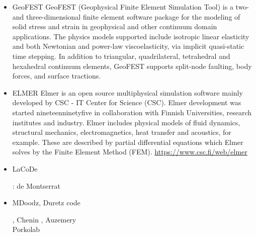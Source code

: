 \begin{itemize}
\item {\codefont GeoFEST} 
GeoFEST (Geophysical Finite Element Simulation Tool) is a two- and three-dimensional finite
element software package for the modeling of solid stress and strain in geophysical and 
other continuum domain applications.
The physics models supported include isotropic linear elasticity and both Newtonian and power-law
viscoelasticity, via implicit quasi-static time stepping. In addition to triangular, 
quadrilateral, tetrahedral and hexahedral continuum elements, GeoFEST supports split-node 
faulting, body forces, and surface tractions.


{\small
\noindent
\cite{paln08}
}

\item {\codefont ELMER} 
Elmer is an open source multiphysical simulation software mainly developed by 
CSC - IT Center for Science (CSC). Elmer development was started nineteenninetyfive in collaboration with 
Finnish Universities, research institutes and industry. Elmer includes physical models of 
fluid dynamics, structural mechanics, electromagnetics, heat transfer and acoustics, 
for example. These are described by partial differential equations which Elmer solves 
by the Finite Element Method (FEM). \url{https://www.csc.fi/web/elmer}

\cite{maierova}
\cite{mals14}

\item {\codefont LaCoDe}  

\begin{scriptsize}
\noindent
\twothousandnineteen: de Montserrat \etal \cite{demh19}
\end{scriptsize}

\item {\codefont MDoodz}, Duretz code

\begin{scriptsize}
\cite{yatd12}
\cite{yahb13}
\cite{yadm15}
\cite{dumy16}\cite{dupm16}
\cite{chmd19}\cite{dual19}\cite{pedm19}
\cite{poyd20}\cite{bedh20}, Chenin \etal \cite{chsm20}, Auzemery \etal \cite{auwy20}\\
\twothousandtwentyone Porkolab \etal \cite{pody21}
\end{scriptsize}


\end{itemize}
